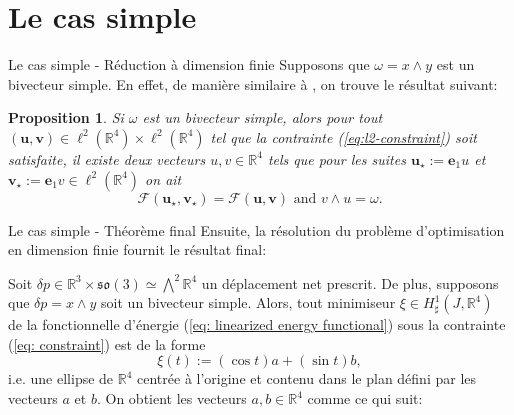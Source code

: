 \documentclass[10pt, envcountsect]{beamer}
\theoremstyle{plain}
\newtheorem{proposition}{Proposition}[section]
\newcommand{\R}{\mathbb{R}}
\newcommand{\so}{\mathfrak{so}}
\begin{document}
\section{Le cas simple}

\begin{frame}{Le cas simple - Réduction à dimension finie}
Supposons que $\omega = x\wedge y$ est un bivecteur simple. En effet, de manière similaire à \cite{Alouges2017}, on trouve le résultat suivant:

\begin{proposition}
\label{prop:simple reduction}
Si $\omega$ est un bivecteur simple, alors pour tout $(\mathbf{u}, \mathbf{v}) \in \ell^2(\R^4) \times \ell^2(\R^4)$ tel que la contrainte (\ref{eq:l2-constraint}) soit satisfaite, il existe deux vecteurs $u,v \in \R^4$ tels que pour les suites $\mathbf{u}_{\star} := \mathbf{e}_1 u$ et $\mathbf{v}_\star := \mathbf{e}_1 v \in \ell^2(\R^4)$ on ait 
\begin{equation}
\mathcal{F}(\mathbf{u_{\star}}, \mathbf{v_{\star}}) = \mathcal{F}(\mathbf{u}, \mathbf{v}) \text{ and } v \wedge u = \omega.
\end{equation}
\end{proposition}
\end{frame}

\begin{frame}{Le cas simple - Théorème final}
Ensuite, la résolution du problème d'optimisation en dimension finie fournit le résultat final:
\begin{theorem}
\label{thm:optimal control curves in the simple case}
Soit $\delta p \in \R^3 \times \so(3) \simeq \bigwedge^2 \R^4$ un déplacement net prescrit. De plus, supposons que $\delta p = x \wedge y$ soit un bivecteur simple. Alors, tout minimiseur $\xi \in H_{\sharp}^1(J, \R^4)$ de la fonctionnelle d'énergie (\ref{eq: linearized energy functional}) sous la contrainte (\ref{eq: constraint}) est de la forme
\begin{equation}
\xi(t) := (\cos t) a + (\sin t) b,
\end{equation}
i.e. une ellipse de $\R^4$ centrée à l'origine et contenu dans le plan défini par les vecteurs $a$ et $b$. On obtient les vecteurs $a,b \in \R^4$ comme ce qui suit:

\end{theorem}
\end{frame}
\end{document}
